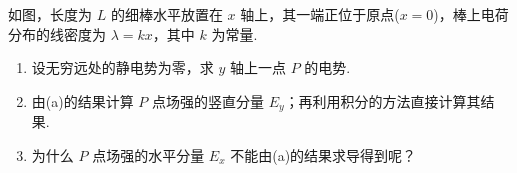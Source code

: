 \begin{exercise}\label{ex:15.15}
如图，长度为 $L$ 的细棒水平放置在 $x$ 轴上，其一端正位于原点($x = 0$)，棒上电荷分布的线密度为 $\lambda = kx$，其中 $k$ 为常量. 
\begin{enumerate}
  \item[(a)] 设无穷远处的静电势为零，求 $y$ 轴上一点 $P$ 的电势. 
  \item[(b)] 由(a)的结果计算 $P$ 点场强的竖直分量 $E_y$；再利用积分的方法直接计算其结果. 
  \item[(c)] 为什么 $P$ 点场强的水平分量 $E_x$ 不能由(a)的结果求导得到呢？
\end{enumerate}
\begin{center}
\end{center}
\end{exercise}
